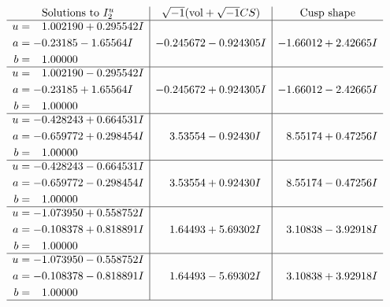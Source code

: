 \documentclass[1p]{elsarticle_modified}
\theoremstyle{definition}
\newcommand{\I}{\sqrt{-1}}
\begin{document}
$$\begin{array}{c|c|c}  
\text{Solutions to }I^u_{2}& \I (\text{vol} + \sqrt{-1}CS) & \text{Cusp shape}\\
 \hline 
\begin{aligned}
u &= \phantom{-}1.002190 + 0.295542 I \\
a &= -0.23185 - 1.65564 I \\
b &= \phantom{-}1.00000\phantom{ +0.000000I}\end{aligned}
 & -0.245672 - 0.924305 I & -1.66012 + 2.42665 I \\ \hline\begin{aligned}
u &= \phantom{-}1.002190 - 0.295542 I \\
a &= -0.23185 + 1.65564 I \\
b &= \phantom{-}1.00000\phantom{ +0.000000I}\end{aligned}
 & -0.245672 + 0.924305 I & -1.66012 - 2.42665 I \\ \hline\begin{aligned}
u &= -0.428243 + 0.664531 I \\
a &= -0.659772 + 0.298454 I \\
b &= \phantom{-}1.00000\phantom{ +0.000000I}\end{aligned}
 & \phantom{-}3.53554 - 0.92430 I & \phantom{-}8.55174 + 0.47256 I \\ \hline\begin{aligned}
u &= -0.428243 - 0.664531 I \\
a &= -0.659772 - 0.298454 I \\
b &= \phantom{-}1.00000\phantom{ +0.000000I}\end{aligned}
 & \phantom{-}3.53554 + 0.92430 I & \phantom{-}8.55174 - 0.47256 I \\ \hline\begin{aligned}
u &= -1.073950 + 0.558752 I \\
a &= -0.108378 + 0.818891 I \\
b &= \phantom{-}1.00000\phantom{ +0.000000I}\end{aligned}
 & \phantom{-}1.64493 + 5.69302 I & \phantom{-}3.10838 - 3.92918 I \\ \hline\begin{aligned}
u &= -1.073950 - 0.558752 I \\
a &= -0.108378 - 0.818891 I \\
b &= \phantom{-}1.00000\phantom{ +0.000000I}\end{aligned}
 & \phantom{-}1.64493 - 5.69302 I & \phantom{-}3.10838 + 3.92918 I\\
 \hline 
 \end{array}$$\newpage\newpage\renewcommand{\arraystretch}{1}
\end{document}
